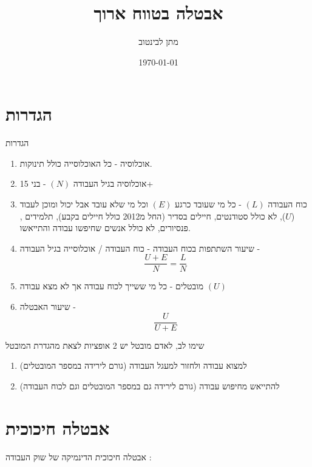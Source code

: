 \documentclass{beamer}
\title[]{אבטלה בטווח ארוך}
\author{מתן לבינטוב}
\institute[{{ אב"ג}}]{{ אוניברסיטת בן גוריון בנגב}}
\date{\today}
\begin{document}
\begin{RTL}
\begin{frame}
\titlepage
\end{frame}
\begin{frame}
    \tableofcontents[sectionstyle=show,
    subsectionstyle=show/shaded/hide,
    subsubsectionstyle=show/shaded/hide]
\end{frame}

\section{הגדרות}
\begin{frame}[allowframebreaks]{הגדרות}
    \begin{enumerate}
        \item אוכלוסיה - כל האוכלוסייה כולל תינוקות.
        \item אוכלוסיה בגיל העבודה $(N)$ - בני 15+ 
        \item כוח העבודה $(L)$ - כל מי שעובד כרגע $(E)$ וכל מי שלא עובד אבל יכול ומוכן לעבוד ($U$), לא כולל סטודנטים, חיילים בסדיר (החל מ2012 כולל חיילים בקבע), תלמידים , פנסיורים, לא כולל אנשים שחיפשו עבודה והתייאשו.
        \item שיעור השתתפות בכוח העבודה - כוח העבודה / אוכלוסייה בגיל העבודה - $$\frac{U + E}{N} = \frac{L}{N}$$
        \item מובטלים - כל מי ששייך לכוח עבודה אך לא מצא עבודה $\left(U\right)$
        \item שיעור האבטלה - $$\frac{U}{U+E}$$
    \end{enumerate}
    
    \framebreak

    \begin{block}{שימו לב, לאדם מובטל יש 2 אופציות לצאת מהגדרת המובטל}
        \begin{enumerate}
            \item למצוא עבודה ולחזור למעגל העבודה (גורם לירידה במספר המובטלים)
            \item להתייאש מחיפוש עבודה (גורם לירידה גם במספר המובטלים וגם לכוח העבודה)
        \end{enumerate}
    \end{block}
\end{frame}
\section{אבטלה חיכוכית}
\begin{frame}[allowframebreaks]{אבטלה חיכוכית}
    הדינמיקה של שוק העבודה : 
    \begin{center}
        \begin{tikzpicture}[
            box/.style={rectangle, draw, minimum width=2.5cm, minimum height=1cm, fill=orange!30},
            myarrow/.style={-Stealth, thick, black}
        ][H]
        

\end{tikzpicture}
\end{center}
\end{frame}
\end{RTL}
\end{document}
